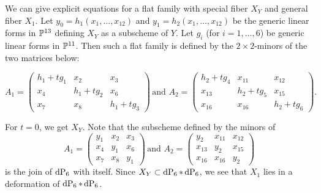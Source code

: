 \begin{remark}
\label{remark_X1}
We can give explicit equations for a flat family with special fiber $X_Y$ and general fiber $X_1$. Let $y_0=h_1(x_1,\ldots,x_{12})$ and $y_1=h_2(x_1,\ldots,x_{12})$ be the generic linear forms in $\P^{13}$ defining $X_Y$ as a subscheme of $Y$. Let $g_i$ (for $i=1,\ldots,6$) be generic linear forms in $\P^{11}$. Then such a flat family is defined by the $2 \times 2$-minors of the two matrices below:

\[
A_1 = \begin{pmatrix}
h_1 + tg_1  & x_2 & x_3 \\
x_4 & h_1+tg_2  & x_6 \\
x_7 & x_8 & h_1+tg_3 
\end{pmatrix}\,
\text{and }
A_2 = \begin{pmatrix}
h_2+tg_4 & x_{11} & x_{12} \\
x_{13} & h_2+tg_5 & x_{15} \\
x_{16} & x_{16} & h_2+tg_6
\end{pmatrix}.
\]

For $t=0$, we get $X_Y$. Note that the subscheme defined by the minors of 
\[
A_1 = \begin{pmatrix}
y_1  & x_2 & x_3 \\
x_4 & y_1  & x_6 \\
x_7 & x_8 & y_1
\end{pmatrix}\,
\text{and }
A_2 = \begin{pmatrix}
y_2 & x_{11} & x_{12} \\
x_{13} & y_2 & x_{15} \\
x_{16} & x_{16} & y_2
\end{pmatrix}
\]
is the join of $\dP6$ with itself. Since $X_Y \subset \dP6 \ast \dP6$, we see that $X_1$ lies in a deformation of $\dP6 \ast \dP6$.
\end{remark}

